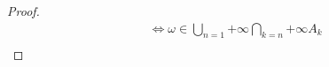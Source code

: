 \documentclass[12pt, a4paper, oneside]{ctexart}
\begin{document}
\begin{proof}
$$\begin{aligned}
                                                                                                                                                                                                                                                                                                                                                                                                                                                                                                                                                                                                                                                                                                                                                                                                                                                                                                                                                                                                                                                                                                                                                                                                                                                                                                                                                                                                                                                                                                                                                                        & \Leftrightarrow \omega \in \bigcup_{n=1}{+\infty}\bigcap_{k=n}{+\infty}A_k    \\

\end{aligned}$$
\end{proof}
\end{document}
